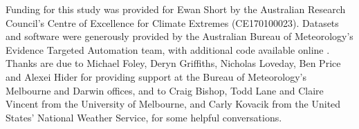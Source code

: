 \documentclass[twocol]{ametsoc}
\begin{document}
\acknowledgments
Funding for this study was provided for Ewan Short by the Australian Research Council's Centre of Excellence for Climate Extremes (CE170100023). Datasets and software were generously provided by the Australian Bureau of Meteorology's Evidence Targeted Automation team, with additional code available online \citep{shortGitVeri19}. Thanks are due to Michael Foley, Deryn Griffiths, Nicholas Loveday, Ben Price and Alexei Hider for providing support at the Bureau of Meteorology's Melbourne and Darwin offices, and to Craig Bishop, Todd Lane and Claire Vincent from the University of Melbourne, and Carly Kovacik from the United States' National Weather Service, for some helpful conversations. 



\end{document}
